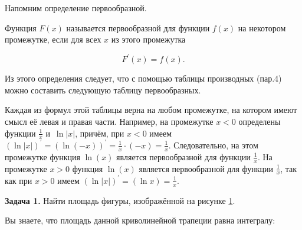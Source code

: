 
Напомним определение первообразной.

Функция $F(x)$ называется первообразной для функции $f(x)$ на некотором промежутке,
если для всех $x$ из этого промежутка

\begin{equation*}
F^\prime(x) = f(x).
\end{equation*}

Из этого определения следует, что с помощью таблицы производных (пар.4)
можно составить следующую таблицу первообразных.


Каждая из формул этой таблицы верна на любом промежутке, на котором имеют смысл
её левая и правая части. Например, на промежутке $x < 0$ определены функции
$\displaystyle \frac{1}{x}$ и~$\ln |x|$, причём, при $x < 0$ имеем
$\displaystyle (\ln |x|)^\prime = (\ln (-x))^\prime = \frac{1}{x} \cdot (-x) = \frac{1}{x}$.
Следовательно, на этом промежутке функция $\ln (x)$ является первообразной для функции
$\displaystyle \frac{1}{x}$. На промежутке $x > 0$ функция $\ln (x)$ является
первообразной для функции $\displaystyle \frac{1}{x}$, так как при $x > 0$ имеем
$\displaystyle \left( \ln |x| \right)^\prime = (\ln x) = \frac{1}{x}$.

\textbf{Задача 1.}\label{ex:5_7_1} Найти площадь фигуры, изображённой
на рисунке \ref{fig:5_7_18}.

\begin{figure}\label{fig:5_7_18}
\end{figure}

Вы знаете, что площадь данной криволинейной трапеции равна интегралу:

